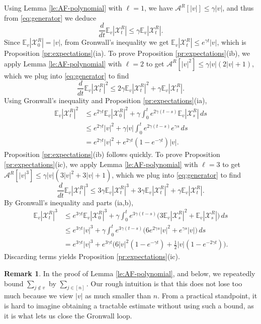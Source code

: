 \documentclass[11pt,reqno]{amsart}
\numberwithin{equation}{section}
\theoremstyle{definition}
\newtheorem{remark}[theorem]{Remark}
\def\A{{\mathcal A}}
\def\E{{\mathbb E}}
\def\X{{\mathcal X}}
\begin{document}
Using Lemma \ref{le:AF-polynomial} with $\ell=1$, we have $\A^{R}[|v|] \le \gamma|v|$, and thus from \eqref{eq:generator} we deduce
\begin{equation*}
\frac{d}{dt}\E_v|\X^{R}_t| \le \gamma \E_v|\X^{R}_t|.
\end{equation*}
Since $\E_v|\X^{R}_0|=|v|$, from Gronwall's inequality we get $\E_v|\X^{R}_t| \le e^{\gamma t}|v|$, which is Proposition \ref{pr:expectations}(ia). To prove Proposition \ref{pr:expectations}(ib), we apply Lemma \ref{le:AF-polynomial} with $\ell=2$ to get $\A^{R}[|v|^2] \le \gamma |v|(2|v|+1)$, which we plug into \eqref{eq:generator} to find
\begin{equation*}
\frac{d}{dt}\E_v|\X^{R}_t|^2 \le 2\gamma \E_v|\X^{R}_t|^2 +  \gamma \E_v|\X^{R}_t|.
\end{equation*}
Using Gronwall's inequality and Proposition \ref{pr:expectations}(ia),
\begin{align*}
\E_v|\X^{R}_t|^2 &\le e^{2\gamma t}\E_v|\X^{R}_0|^2 +  \gamma \int_0^t e^{2\gamma(t-s)}\E_v|\X^{R}_s|\,ds \\
	&\le e^{2\gamma t}|v|^2  +  \gamma |v| \int_0^t e^{2\gamma(t-s)}e^{\gamma s}\,ds \\
	&= e^{2\gamma t}|v|^2  +  e^{2\gamma t}(1-e^{-\gamma t})|v| .
\end{align*}
Proposition \ref{pr:expectations}(ib) follows quickly. To prove Proposition \ref{pr:expectations}(ic), we apply Lemma \ref{le:AF-polynomial} with $\ell=3$ to get $\A^{R}[|v|^3] \le  \gamma |v|(3|v|^2+3|v|+1)$, which we plug into \eqref{eq:generator} to find
\begin{equation*}
\frac{d}{dt}\E_v|\X^{R}_t|^3 \le 3\gamma \E_v|\X^{R}_t|^3 + 3\gamma \E_v|\X^{R}_t|^2 + \gamma \E_v|\X^{R}_t|.
\end{equation*}
By Gronwall's inequality and parts (ia,b),
\begin{align*}
\E_v|\X^{R}_t|^3 &\le e^{3\gamma t}\E_v|\X^{R}_0|^3 +  \gamma \int_0^t e^{3\gamma (t-s)}\big( 3\E_v|\X^{R}_s|^2 + \E_v|\X^{R}_s|\big)\,ds \\
	&\le e^{3\gamma t}|v|^3 + \gamma \int_0^t e^{3\gamma (t-s)}\big( 6e^{2\gamma s}|v|^2 + e^{\gamma s}|v| \big)\,ds \\
	&= e^{3\gamma t}|v|^3 +   e^{3\gamma t}\big(6|v|^2(1-e^{-\gamma t}) +  \tfrac12|v|(1-e^{-2\gamma t})\big).
\end{align*}
Discarding terms yields Proposition \ref{pr:expectations}(ic). 



\begin{remark}
In the proof of Lemma \ref{le:AF-polynomial}, and below, we repeatedly bound $\sum_{j \notin v}$ by $\sum_{j \in [n]}$. Our rough intuition is that this does not lose too much  because we view $|v|$ as much smaller than $n$. From a practical standpoint, it is hard to imagine obtaining a tractable estimate without using such a bound, as it is what lets us close the Gronwall loop.
\end{remark}		
\end{document}
